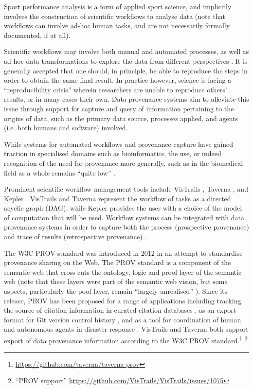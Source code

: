 {Sport performance analysis is a form of applied sport science, and
implicitly involves the construction of scientific workflows to analyse
data (note that workflows can involve ad-hoc human tasks, and are not
necessarily formally documented, if at all).}

{}

{Scientific workflows \cite{Gil2007} may involve both manual and
automated processes, as well as ad-hoc data transformations to explore
the data from different perspectives \cite{Jankun-Kelly2007}. It is
generally accepted that one should, in principle, be able to reproduce
the steps in order to obtain the same final result. In practice however,
science is facing a ``reproducibility crisis'' \cite{Baker2016} wherein
researchers are unable to reproduce others' results, or in many cases
their own. }{Data provenance }{systems aim to alleviate this issue
through support for capture and query of information pertaining to the
origins of data, such as the primary data source, processes
applied, and agents (i.e. both humans and software) involved.}

{}

{While systems for automated workflows and provenance capture have
gained traction in specialised domains such as bioinformatics, the use,
or indeed recognition of the need for provenance more generally, such as
in the biomedical field as a whole remains ``quite low''
\cite{Baum2017}.}

{}

{Prominent scientific workflow management tools include VisTrails
\cite{Callahan2006}, Taverna \cite{Oinn2004}, and Kepler \cite{Bowers2006}.
VisTrails and Taverna represent the workflow of tasks as a directed
acyclic graph (DAG), while Kepler provides the user with a choice of the
model of computation that will be used. Workflow systems can be
integrated with data provenance systems in order to capture both the
process (prospective provenance) and trace of results (retrospective
provenance) \cite{Missier2013}.}

{}

{The W3C PROV standard \cite{Moreau2015} was introduced in 2012 in an
attempt to standardise }{provenance sharing on the Web. The PROV
standard is a component of the semantic web that cross-cuts the
ontology, logic and proof layer of the semantic web \cite{Moreau2013} (note that these layers
were part of the semantic web vision, but some aspects, particularly the
poof layer, remain ``largely unrealised'' \cite{Shadbolt2006}). Since its
release, PROV has been proposed for a range of applications including
tracking the source of citation information in curated citation
databases \cite{Peroni2017}, as an export format for Git version control
history \cite{DeNies2013}, and as a tool for coordination of human and
autonomous agents in disaster response \cite{Ramchurn2016}}. VisTrails
and Taverna both support export of data provenance information according
to the W3C PROV standard.\footnote{\url{https://github.com/taverna/taverna-prov}}
\footnote{``PROV support'' \url{https://github.com/VisTrails/VisTrails/issues/1075}}


